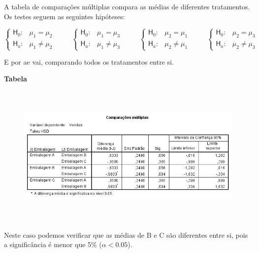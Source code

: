 			A tabela de comparações múltiplas compara as médias de diferentes tratamentos. Os testes seguem as seguintes hipóteses:

			\bigskip

			$
			\begin{cases}
				\mathsf{H}_{0} : & \mu_{1} = \mu_{2} \\
				\mathsf{H}_{a} : & \mu_{1} \neq \mu_{2}
			\end{cases} \hspace{1cm}			
			\begin{cases}
				\mathsf{H}_{0} : & \mu_{1} = \mu_{3} \\
				\mathsf{H}_{a} : & \mu_{1} \neq \mu_{3}
			\end{cases} \hspace{1cm}
			\begin{cases}
				\mathsf{H}_{0} : & \mu_{2} = \mu_{1} \\
				\mathsf{H}_{a} : & \mu_{2} \neq \mu_{1}
			\end{cases} \hspace{1cm}
			\begin{cases}
				\mathsf{H}_{0} : & \mu_{2} = \mu_{3} \\
				\mathsf{H}_{a} : & \mu_{2} \neq \mu_{3}
			\end{cases}
			$
			
			\bigskip

			E por ae vai, comparando todos os tratamentos entre si.

			\bigskip
			
			\textbf{Tabela}
			
			\begin{figure}[H]
				\centering		
				\includegraphics[height=7cm]{images/anova_comparacoes-multiplas}
			\end{figure}
			
			Neste caso podemos verificar que as médias de B e C são diferentes entre si, pois a significância é menor que 5\% ($ \alpha < 0.05$).

